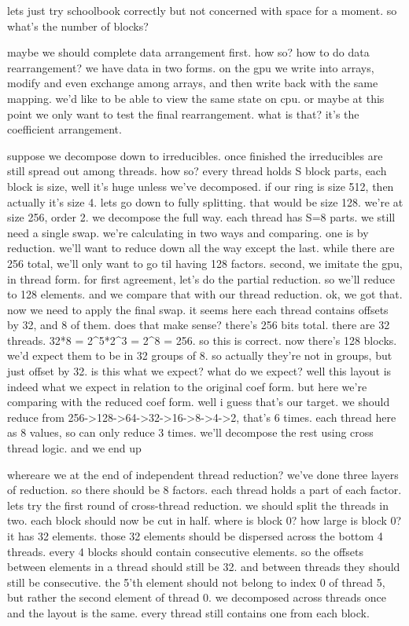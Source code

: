 lets just try schoolbook correctly but not concerned with space for a moment.
so what's the number of blocks? 

maybe we should complete data arrangement first.
how so?
how to do data rearrangement?
we have data in two forms.
on the gpu we write into arrays, modify and even exchange among arrays, and then write back with the same mapping. we'd like to be able to view the same state on cpu. or maybe at this point we only want to test the final rearrangement. what is that? it's the coefficient arrangement.


suppose we decompose down to irreducibles.
once finished the irreducibles are still spread out among threads. how so? every thread holds S block parts, each block is size, well it's huge unless we've decomposed. if our ring is size 512, then actually it's size 4. lets go down to fully splitting. that would be size 128. 
we're at size 256, order 2. we decompose the full way. each thread has S=8 parts. we still need a single swap. 
we're calculating in two ways and comparing. one is by reduction. we'll want to reduce down all the way except the last. while there are 256 total, we'll only want to go til having 128 factors. second, we imitate the gpu, in thread form. 
for first agreement, let's do the partial reduction. so we'll reduce to 128 elements. and we compare that with our thread reduction.
ok, we got that. now we need to apply the final swap. 
it seems here each thread contains offsets by 32, and 8 of them. 
does that make sense? there's 256 bits total. there are 32 threads.
32*8 = 2^5*2^3 = 2^8 = 256. so this is correct. 
now there's 128 blocks. we'd expect them to be in 32 groups of 8. 
so actually they're not in groups, but just offset by 32. is this what we expect? what do we expect? well this layout is indeed what we expect in relation to the original coef form. but here we're comparing with the reduced coef form. well i guess that's our target.
we should reduce from 256->128->64->32->16->8->4->2, that's 6 times. each thread here as 8 values, so can only reduce 3 times. we'll decompose the rest using cross thread logic. 
and we end up 

whereare we at the end of independent thread reduction?
we've done three layers of reduction. so there should be 8 factors. each thread holds a part of each factor.
lets try the first round of cross-thread reduction. we should split the threads in two. each block should now be cut in half. where is block 0? how large is block 0? it has 32 elements. those 32 elements should be dispersed across the bottom 4 threads. 
every 4 blocks should contain consecutive elements. so the offsets between elements in a thread should still be 32. and between threads they should still be consecutive. the 5'th element should not belong to index 0 of thread 5, but rather the second element of thread 0. 
we decomposed across threads once and the layout is the same. every thread still contains one from each block. 

